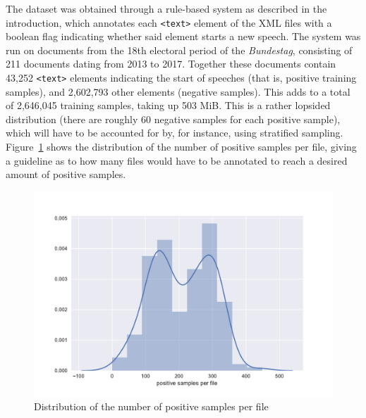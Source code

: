 The dataset was obtained through a rule-based system as described in the
introduction, which annotates each \texttt{<text>} element of the XML files with
a boolean flag indicating whether said element starts a new speech. The system
was run on documents from the 18th electoral period of the \emph{Bundestag},
consisting of 211 documents dating from 2013 to 2017. Together these documents
contain 43,252 \texttt{<text>} elements indicating the start of speeches (that
is, positive training samples), and 2,602,793 other elements (negative samples).
This adds to a total of 2,646,045 training samples, taking up 503 MiB. This is a
rather lopsided distribution (there are roughly 60 negative samples for each
positive sample), which will have to be accounted for by, for instance, using
stratified sampling. Figure~\ref{fig:data_dist} shows the distribution of the
number of positive samples per file, giving a guideline as to how many files
would have to be annotated to reach a desired amount of positive samples.

\begin{figure}[tb]
  \centering
  \includegraphics[width=\textwidth]{figures/distribution.pdf}
  \caption{Distribution of the number of positive samples per file}%
  \label{fig:data_dist}
\end{figure}

